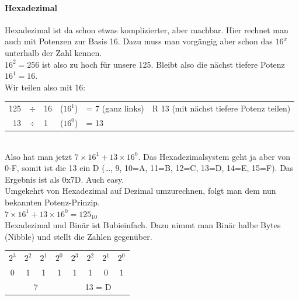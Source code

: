\pagebreak
\paragraph{Hexadezimal}Hexadezimal ist da schon etwas komplizierter, aber machbar. Hier rechnet man auch mit Potenzen zur Basis 16. Dazu muss man vorgängig aber schon das $16^x$ unterhalb der Zahl kennen.\\
$16^2=256$ ist also zu hoch für unsere 125. Bleibt also die nächst tiefere Potenz  $16^1=16$.\\
Wir teilen also mit 16:\\
\begin{tabular}{rcllll}
    125&$\div$&16&($16^1$)&= 7 (ganz links)&R  13 (mit nächst tiefere Potenz teilen)\\
    13&$\div$&1&($16^0$) &= 13&\\[1em]
\end{tabular}\\
Also hat man jetzt $7\times16^1+13\times16^0$. Das Hexadezimalsystem geht ja aber von 0-F, somit ist die 13 ein D (\dots, 9, 10=A, 11=B, 12=C, 13=D, 14=E, 15=F). Das Ergebnis ist als 0x7D. Auch easy.\\[1em]
Umgekehrt von Hexadezimal auf Dezimal umzurechnen, folgt man dem nun bekannten Potenz-Prinzip.\\$7\times16^1+13\times16^0=125_{10}$\\[1em]
Hexadezimal und Binär ist Bubieinfach. Dazu nimmt man Binär halbe Bytes (Nibble) und stellt die Zahlen gegenüber.\\
\begin{tabular}{cccc|cccc}
    $2^3$&$2^2$&$2^1$&$2^0$&$2^3$&$2^2$&$2^1$&$2^0$\\
    0&1&1&1&1&1&0&1\\
    \hline
    \multicolumn{4}{c|}{7}&\multicolumn{4}{c}{13 = D}\\
\end{tabular}\\[1em]

